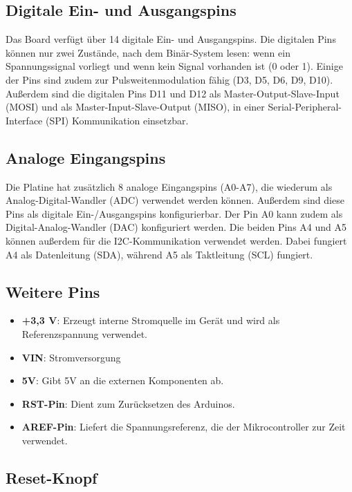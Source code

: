 \subsection{Digitale Ein- und Ausgangspins}

Das Board verfügt über 14 digitale Ein- und Ausgangspins. Die digitalen Pins können nur zwei Zustände, nach dem Binär-System lesen: wenn ein Spannungssignal vorliegt und wenn kein Signal vorhanden ist (0 oder 1). Einige der Pins sind zudem zur Pulsweitenmodulation fähig (D3, D5, D6, D9, D10). Außerdem sind die digitalen Pins D11 und D12 als Master-Output-Slave-Input (MOSI) und als Master-Input-Slave-Output (MISO), in einer Serial-Peripheral-Interface (SPI) Kommunikation einsetzbar.\cite{Ard.2024}

\subsection{Analoge Eingangspins}

Die Platine hat zusätzlich 8 analoge Eingangspins (A0-A7), die wiederum als Analog-Digital-Wandler (ADC) verwendet werden können. Außerdem sind diese Pins als digitale Ein-/Ausgangspins konfigurierbar. Der Pin A0 kann zudem als Digital-Analog-Wandler (DAC) konfiguriert werden. Die beiden Pins A4 und A5 können außerdem für die I2C-Kommunikation verwendet werden. Dabei fungiert A4 als Datenleitung (SDA), während A5 als Taktleitung (SCL) fungiert.\cite{Ard.2024}

\subsection{Weitere Pins}
	\begin{itemize}
		\item \textbf{+3,3 V}: Erzeugt interne Stromquelle im Gerät und wird als Referenzspannung verwendet.
		\item \textbf{VIN}: Stromversorgung
		\item \textbf{5V}: Gibt 5V an die externen Komponenten ab. 
		\item \textbf{RST-Pin}: Dient zum Zurücksetzen des Arduinos.
		\item \textbf{AREF-Pin}: Liefert die Spannungsreferenz, die der Mikrocontroller zur Zeit verwendet.
		\\ \cite{Ard.2024}
	\end{itemize}

\subsection{Reset-Knopf}

